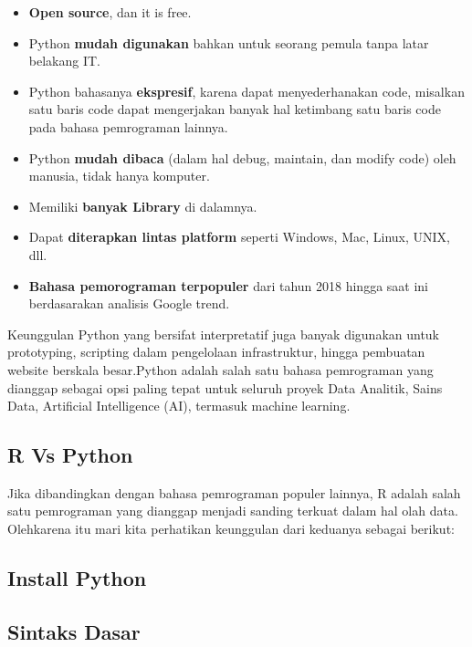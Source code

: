 \documentclass[
]{docs}
\providecommand{\tightlist}{%
  \setlength{\itemsep}{0pt}\setlength{\parskip}{0pt}}
\begin{document}
\begin{itemize}
\tightlist
\item
  \textbf{Open source}, dan it is free.
\item
  Python \textbf{mudah digunakan} bahkan untuk seorang pemula tanpa latar belakang IT.
\item
  Python bahasanya \textbf{ekspresif}, karena dapat menyederhanakan code, misalkan satu baris code dapat mengerjakan banyak hal ketimbang satu baris code pada bahasa pemrograman lainnya.
\item
  Python \textbf{mudah dibaca} (dalam hal debug, maintain, dan modify code) oleh manusia, tidak hanya komputer.
\item
  Memiliki \textbf{banyak Library} di dalamnya.
\item
  Dapat \textbf{diterapkan lintas platform} seperti Windows, Mac, Linux, UNIX, dll.
\item
  \textbf{Bahasa pemorograman terpopuler} dari tahun 2018 hingga saat ini berdasarakan analisis Google trend.
\end{itemize}

Keunggulan Python yang bersifat interpretatif juga banyak digunakan untuk prototyping, scripting dalam pengelolaan infrastruktur, hingga pembuatan website berskala besar.Python adalah salah satu bahasa pemrograman yang dianggap sebagai opsi paling tepat untuk seluruh proyek Data Analitik, Sains Data, Artificial Intelligence (AI), termasuk machine learning.

\hypertarget{r-vs-python}{%
\subsection{R Vs Python}\label{r-vs-python}}

Jika dibandingkan dengan bahasa pemrograman populer lainnya, R adalah salah satu pemrograman yang dianggap menjadi sanding terkuat dalam hal olah data. Olehkarena itu mari kita perhatikan keunggulan dari keduanya sebagai berikut:

\hypertarget{install-python}{%
\subsection{Install Python}\label{install-python}}

\hypertarget{sintaks-dasar}{%
\subsection{Sintaks Dasar}\label{sintaks-dasar}}
\end{document}
